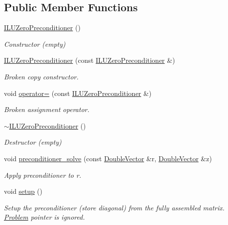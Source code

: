 \subsection*{Public Member Functions}
\begin{DoxyCompactItemize}
\item 
\hyperlink{classoomph_1_1ILUZeroPreconditioner_3_01CRDoubleMatrix_01_4_a2a2831a593826062e795bca285439cf7}{I\+L\+U\+Zero\+Preconditioner} ()
\begin{DoxyCompactList}\small\item\em Constructor (empty) \end{DoxyCompactList}\item 
\hyperlink{classoomph_1_1ILUZeroPreconditioner_3_01CRDoubleMatrix_01_4_a81c87e4d48b4a925e55e03559ad8cd3b}{I\+L\+U\+Zero\+Preconditioner} (const \hyperlink{classoomph_1_1ILUZeroPreconditioner}{I\+L\+U\+Zero\+Preconditioner} \&)
\begin{DoxyCompactList}\small\item\em Broken copy constructor. \end{DoxyCompactList}\item 
void \hyperlink{classoomph_1_1ILUZeroPreconditioner_3_01CRDoubleMatrix_01_4_a57381875090420fc4bfd28a5247dd898}{operator=} (const \hyperlink{classoomph_1_1ILUZeroPreconditioner}{I\+L\+U\+Zero\+Preconditioner} \&)
\begin{DoxyCompactList}\small\item\em Broken assignment operator. \end{DoxyCompactList}\item 
\hyperlink{classoomph_1_1ILUZeroPreconditioner_3_01CRDoubleMatrix_01_4_a118c982a62303d09d3f85fce26df1f76}{$\sim$\+I\+L\+U\+Zero\+Preconditioner} ()
\begin{DoxyCompactList}\small\item\em Destructor (empty) \end{DoxyCompactList}\item 
void \hyperlink{classoomph_1_1ILUZeroPreconditioner_3_01CRDoubleMatrix_01_4_ae0bff88ef761683c868110347c6d81db}{preconditioner\+\_\+solve} (const \hyperlink{classoomph_1_1DoubleVector}{Double\+Vector} \&r, \hyperlink{classoomph_1_1DoubleVector}{Double\+Vector} \&z)
\begin{DoxyCompactList}\small\item\em Apply preconditioner to r. \end{DoxyCompactList}\item 
void \hyperlink{classoomph_1_1ILUZeroPreconditioner_3_01CRDoubleMatrix_01_4_a2398a8674540bfdb8d69a699085107d8}{setup} ()
\begin{DoxyCompactList}\small\item\em Setup the preconditioner (store diagonal) from the fully assembled matrix. \hyperlink{classoomph_1_1Problem}{Problem} pointer is ignored. \end{DoxyCompactList}\end{DoxyCompactItemize}
